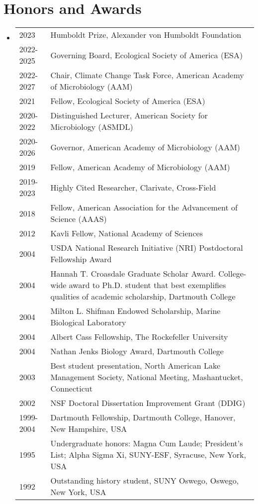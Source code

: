 \documentclass[11pt]{article}
\begin{document}
\section*{Honors and Awards}
\begin{itemize}[left=0pt,label={}]
  \item \begin{tabular}{@{}p{2cm} p{13cm}}
    2023 & Humboldt Prize, Alexander von Humboldt Foundation \\
    2022-2025 & Governing Board, Ecological Society of America (ESA) \\
    2022-2027 & Chair, Climate Change Task Force, American Academy of Microbiology (AAM) \\
    2021 & Fellow, Ecological Society of America (ESA) \\
    2020-2022 & Distinguished Lecturer, American Society for Microbiology (ASMDL) \\
    2020-2026 & Governor, American Academy of Microbiology (AAM) \\
    2019 & Fellow, American Academy of Microbiology (AAM) \\
    2019-2023 & Highly Cited Researcher, Clarivate, Cross-Field \\
    2018 & Fellow, American Association for the Advancement of Science (AAAS) \\
    2012 & Kavli Fellow, National Academy of Sciences \\
    2004 & USDA National Research Initiative (NRI) Postdoctoral Fellowship Award \\
    2004 & Hannah T. Croasdale Graduate Scholar Award. College-wide award to Ph.D. student that best exemplifies qualities of academic scholarship, Dartmouth College \\
    2004 & Milton L. Shifman Endowed Scholarship, Marine Biological Laboratory \\
    2004 & Albert Cass Fellowship, The Rockefeller University \\
    2004 & Nathan Jenks Biology Award, Dartmouth College \\
    2003 & Best student presentation, North American Lake Management Society, National Meeting, Mashantucket, Connecticut \\
    2002 & NSF Doctoral Dissertation Improvement Grant (DDIG) \\
    1999-2004 & Dartmouth Fellowship, Dartmouth College, Hanover, New Hampshire, USA \\
    1995 & Undergraduate honors: Magna Cum Laude; President’s List; Alpha Sigma Xi, SUNY-ESF, Syracuse, New York, USA \\
    1992 & Outstanding history student, SUNY Oswego, Oswego, New York, USA \\
  \end{tabular}
\end{itemize}
\end{document}
